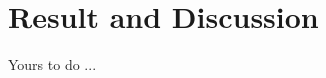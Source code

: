 \documentclass[../../main.tex]{subfiles}
\begin{document}
    \section{Result and Discussion}
        Yours to do ...
\end{document}
